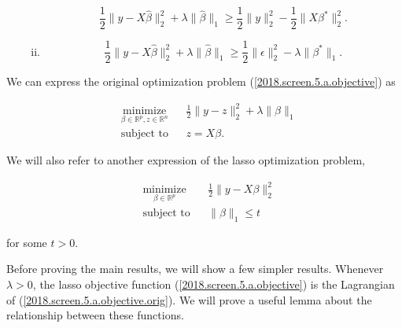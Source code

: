 \begin{proposition}
\begin{enumerate}[(a)]
\begin{enumerate}[(i)]
\[
\frac{1}{2} \lVert y - X \hat{\beta} \rVert_2^2 + \lambda \lVert \hat{\beta}\rVert_1 \geq \frac{1}{2} \lVert y \rVert_2^2 - \frac{1}{2} \lVert X \beta^* \rVert_2^2.
\]

\item 

\[
\frac{1}{2} \lVert y - X \hat{\beta} \rVert_2^2 + \lambda \lVert \hat{\beta} \rVert_1 \geq \frac{1}{2} \lVert \epsilon \rVert_2^2 - \lambda \lVert \beta^* \rVert_1.
\]

\end{enumerate}

\end{enumerate}

\end{proposition}

\begin{remark}

We can express the original optimization problem (\ref{2018.screen.5.a.objective}) as 

\begin{equation}\label{2018.screen.5.a.objective.alt}
\begin{aligned}
& \underset{\beta \in \mathbb{R}^p, z \in \mathbb{R}^n}{\text{minimize}}
& & \frac{1}{2} \lVert y - z \rVert_2^2 + \lambda \lVert \beta \rVert_1 \\
& \text{subject to}
& & z = X \beta.
\end{aligned}
\end{equation}

We will also refer to another expression of the lasso optimization problem,

\begin{equation}\label{2018.screen.5.a.objective.orig}
\begin{aligned}
& \underset{\beta \in \mathbb{R}^p}{\text{minimize}}
& & \frac{1}{2} \lVert y - X \beta \rVert_2^2 \\
& \text{subject to}
& & \lVert\beta \rVert_1 \leq t
\end{aligned}
\end{equation}

for some \(t >0\). 

\end{remark}

Before proving the main results, we will show a few simpler results. Whenever \(\lambda > 0\), the lasso objective function (\ref{2018.screen.5.a.objective}) is the Lagrangian of (\ref{2018.screen.5.a.objective.orig}). We will prove a useful lemma about the relationship between these functions.

